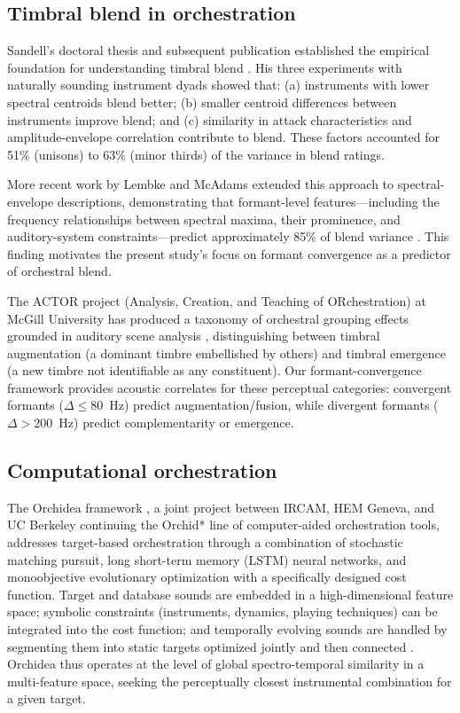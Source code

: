 \documentclass[12pt,a4paper]{article}
\begin{document}
\subsection{Timbral blend in orchestration}

Sandell's doctoral thesis and subsequent publication established the empirical
foundation for understanding timbral blend \citep{Sandell1991,Sandell1995}.
His three experiments with naturally sounding instrument dyads showed that: (a)
instruments with lower spectral centroids blend better; (b) smaller centroid
differences between instruments improve blend; and (c) similarity in attack
characteristics and amplitude-envelope correlation contribute to blend. These
factors accounted for 51\% (unisons) to 63\% (minor thirds) of the variance in
blend ratings.

More recent work by Lembke and McAdams extended this approach to spectral-envelope
descriptions, demonstrating that formant-level features---including the frequency
relationships between spectral maxima, their prominence, and auditory-system
constraints---predict approximately 85\% of blend variance
\citep{Lembke2015,Lembke2017}. This finding motivates the present study's focus
on formant convergence as a predictor of orchestral blend.

The ACTOR project (Analysis, Creation, and Teaching of ORchestration) at McGill
University has produced a taxonomy of orchestral grouping effects grounded in
auditory scene analysis \citep{Goodchild2018,McAdams2022}, distinguishing between
timbral augmentation (a dominant timbre embellished by others) and timbral
emergence (a new timbre not identifiable as any constituent). Our formant-convergence
framework provides acoustic correlates for these perceptual categories: convergent
formants ($\Delta \leq 80$~Hz) predict augmentation/fusion, while divergent
formants ($\Delta > 200$~Hz) predict complementarity or emergence.

\subsection{Computational orchestration}

The Orchidea framework \citep{Cella2020,Cella2021}, a joint project between
IRCAM, HEM Geneva, and UC Berkeley continuing the Orchid* line of
computer-aided orchestration tools, addresses target-based orchestration through
a combination of stochastic matching pursuit, long short-term memory (LSTM)
neural networks, and monoobjective evolutionary optimization with a specifically
designed cost function. Target and database sounds are embedded in a
high-dimensional feature space; symbolic constraints (instruments, dynamics,
playing techniques) can be integrated into the cost function; and temporally
evolving sounds are handled by segmenting them into static targets optimized
jointly and then connected \citep{Cella2021}. Orchidea thus operates at the
level of global spectro-temporal similarity in a multi-feature space, seeking
the perceptually closest instrumental combination for a given target.
\end{document}
